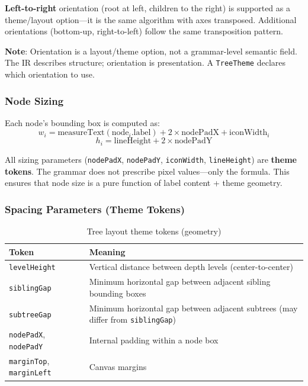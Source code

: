 \textbf{Left-to-right} orientation (root at left, children to the right) is supported as a theme/layout option---it is the same algorithm with axes transposed. Additional orientations (bottom-up, right-to-left) follow the same transposition pattern.

\textbf{Note}: Orientation is a layout/theme option, not a grammar-level semantic field. The IR describes structure; orientation is presentation. A \texttt{TreeTheme} declares which orientation to use.

\subsubsection{Node Sizing}

Each node's bounding box is computed as:
$$
  w_i = \text{measureText}(\text{node}_i.\text{label}) + 2 \times \text{nodePadX} + \text{iconWidth}_i
$$
$$
  h_i = \text{lineHeight} + 2 \times \text{nodePadY}
$$

All sizing parameters (\texttt{nodePadX}, \texttt{nodePadY}, \texttt{iconWidth}, \texttt{lineHeight}) are \textbf{theme tokens}. The grammar does not prescribe pixel values---only the formula. This ensures that node size is a pure function of label content + theme geometry.

\subsubsection{Spacing Parameters (Theme Tokens)}

\begin{table}[h]
\centering
\small
\begin{tabular}{lp{7cm}}
\toprule
\textbf{Token} & \textbf{Meaning} \\
\midrule
\texttt{levelHeight} & Vertical distance between depth levels (center-to-center) \\
\texttt{siblingGap} & Minimum horizontal gap between adjacent sibling bounding boxes \\
\texttt{subtreeGap} & Minimum horizontal gap between adjacent subtrees (may differ from \texttt{siblingGap}) \\
\texttt{nodePadX}, \texttt{nodePadY} & Internal padding within a node box \\
\texttt{marginTop}, \texttt{marginLeft} & Canvas margins \\
\bottomrule
\end{tabular}
\caption{Tree layout theme tokens (geometry)}
\label{tab:tree-layout-tokens}
\end{table}

